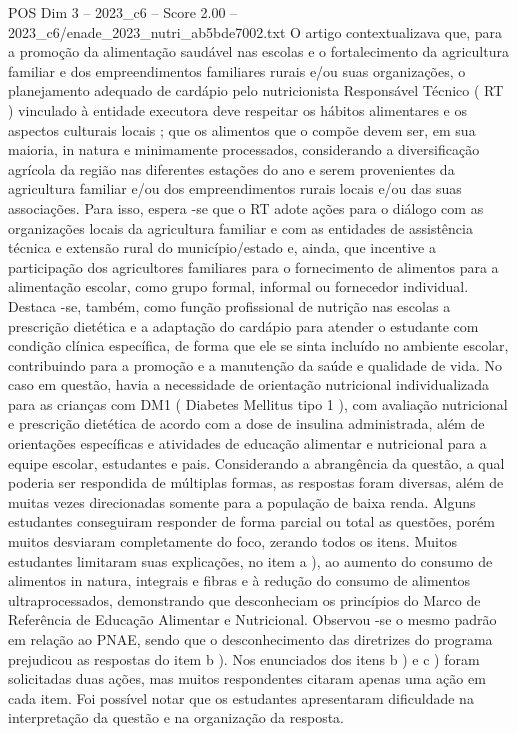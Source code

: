 \begin{textsample}{POS Dim 3 – 2023\_c6 – Score 2.00 – 2023\_c6/enade\_2023\_nutri\_ab5bde7002.txt}
O artigo contextualizava que, para a promoção da alimentação saudável nas escolas e o fortalecimento da agricultura familiar e dos empreendimentos familiares rurais e/ou suas organizações, o planejamento adequado de cardápio pelo nutricionista Responsável Técnico ( RT ) vinculado à entidade executora deve respeitar os hábitos alimentares e os aspectos culturais locais ; que os alimentos que o compõe devem ser, em sua maioria, in natura e minimamente processados, considerando a diversificação agrícola da região nas diferentes estações do ano e serem provenientes da agricultura familiar e/ou dos empreendimentos rurais locais e/ou das suas associações.
Para isso, espera -se que o RT adote ações para o diálogo com as organizações locais da agricultura familiar e com as entidades de assistência técnica e extensão rural do município/estado e, ainda, que incentive a participação dos agricultores familiares para o fornecimento de alimentos para a alimentação escolar, como grupo formal, informal ou fornecedor individual.
Destaca -se, também, como função profissional de nutrição nas escolas a prescrição dietética e a adaptação do cardápio para atender o estudante com condição clínica específica, de forma que ele se sinta incluído no ambiente escolar, contribuindo para a promoção e a manutenção da saúde e qualidade de vida.
No caso em questão, havia a necessidade de orientação nutricional individualizada para as crianças com DM1 ( Diabetes Mellitus tipo 1 ), com avaliação nutricional e prescrição dietética de acordo com a dose de insulina administrada, além de orientações específicas e atividades de educação alimentar e nutricional para a equipe escolar, estudantes e pais.
Considerando a abrangência da questão, a qual poderia ser respondida de múltiplas formas, as respostas foram diversas, além de muitas vezes direcionadas somente para a população de baixa renda.
Alguns estudantes conseguiram responder de forma parcial ou total as questões, porém muitos desviaram completamente do foco, zerando todos os itens.
Muitos estudantes limitaram suas explicações, no item a ), ao aumento do consumo de alimentos in natura, integrais e fibras e à redução do consumo de alimentos ultraprocessados, demonstrando que desconheciam os princípios do Marco de Referência de Educação Alimentar e Nutricional.
Observou -se o mesmo padrão em relação ao PNAE, sendo que o desconhecimento das diretrizes do programa prejudicou as respostas do item b ).
Nos enunciados dos itens b ) e c ) foram solicitadas duas ações, mas muitos respondentes citaram apenas uma ação em cada item.
Foi possível notar que os estudantes apresentaram dificuldade na interpretação da questão e na organização da resposta.

\end{textsample}
